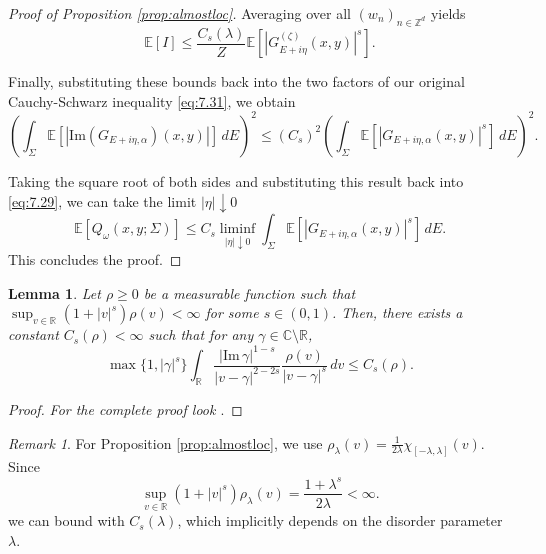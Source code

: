 \documentclass[11pt, a4paper, UKenglish, oneside]{book}
\theoremstyle{plain}
\newtheorem{lemma}[theorem]{Lemma}
\theoremstyle{remark}
\newtheorem{remark}[theorem]{Remark}
\theoremstyle{definition}
\numberwithin{equation}{section}
\numberwithin{theorem}{section}
\begin{document}
\begin{proof}[Proof of Proposition \ref{prop:almostloc}]
    Averaging over all $(w_n)_{n \in \mathbb{Z}^d}$ yields
    \begin{equation*}
    \mathbb{E}[I] \le \frac{C_s(\lambda)}{Z} \mathbb{E} \left[ |G_{E+i\eta}^{(\zeta)}(x,y)|^s \right].
    \end{equation*}

    Finally, substituting these bounds back into the two factors of our original Cauchy-Schwarz inequality \eqref{eq:7.31}, we obtain
    \begin{equation*}
        \left( \int_\Sigma \mathbb{E}[|\mathrm{Im}(G_{E + i\eta,\alpha})(x,y)|] \, dE \right)^2 \le (C_s)^2 \left( \int_\Sigma \mathbb{E}[|G_{E+i\eta,\alpha}(x,y)|^s] \, dE \right)^2.
    \end{equation*}

    Taking the square root of both sides and substituting this result back into \eqref{eq:7.29}, we can take the limit $|\eta| \downarrow 0$
    \begin{equation}
        \mathbb{E}[Q_\omega(x,y;\Sigma)] \le C_s \liminf_{|\eta| \downarrow 0} \int_\Sigma \mathbb{E}[|G_{E+i\eta,\alpha}(x,y)|^s] \, dE.
    \end{equation}
    This concludes the proof.
\end{proof}




\begin{lemma} \label{lemma:7.8}
Let $\rho \ge 0$ be a measurable function such that $\sup_{v \in \mathbb{R}} (1+|v|^s)\rho(v) < \infty$ for some $s \in (0,1)$. Then, there exists a constant $C_s(\rho) < \infty$ such that for any $\gamma \in \mathbb{C} \setminus \mathbb{R}$,
\begin{equation} \label{eq:7.35}
    \max\{1, |\gamma|^s\} \int_{\mathbb{R}} \frac{|\mathrm{Im} \, \gamma|^{1-s}}{|v-\gamma|^{2-2s}} \frac{\rho(v)}{|v-\gamma|^s} \, dv \le C_s(\rho).
\end{equation}
\end{lemma}

\begin{proof}
    \textit{For the complete proof look \cite[Lemma 7.8]{aizenman2015}}.
\end{proof}

\begin{remark}
    For Proposition \ref{prop:almostloc}, we use $\rho_\lambda(v) = \frac{1}{2\lambda} \chi_{[-\lambda, \lambda]}(v)$. Since
    \[
    \sup_{v \in \mathbb{R}} (1+|v|^s)\rho_\lambda(v) = \frac{1+\lambda^s}{2\lambda} < \infty.
    \]
    we can bound with $ C_s(\lambda)$, which implicitly depends on the disorder parameter $\lambda$.
\end{remark}
\end{document}

